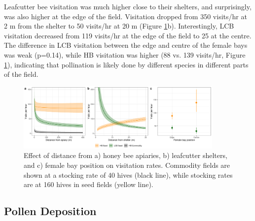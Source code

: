\documentclass[12pt]{article} %
\begin{document}
Leafcutter bee visitation was much higher close to their shelters, and surprisingly, was also higher at the edge of the field.
Visitation dropped from 350 visits/hr at 2 m from the shelter to 50 visits/hr at 20 m (Figure \ref{fig:allVisits}b). 
Interestingly, LCB visitation decreased from 119 visits/hr at the edge of the field to 25 at the centre.
The difference in LCB visitation between the edge and centre of the female bays was weak (p=0.14), while HB visitation was higher (88 vs. 139 visits/hr, Figure \ref{fig:allVisits}), indicating that pollination is likely done by different species in different parts of the field.

\begin{figure}
    \centering
    \includegraphics[width=0.9\textwidth,keepaspectratio=true]{../Figures/allVisits.png}
    \caption{Effect of distance from a) honey bee apiaries, b) leafcutter shelters, and c) female bay position on visitation rates. Commodity fields are shown at a stocking rate of 40 hives (black line), while stocking rates are at 160 hives in seed fields (yellow line).}
    \label{fig:allVisits}
\end{figure}

\subsection{Pollen Deposition}
\end{document}
